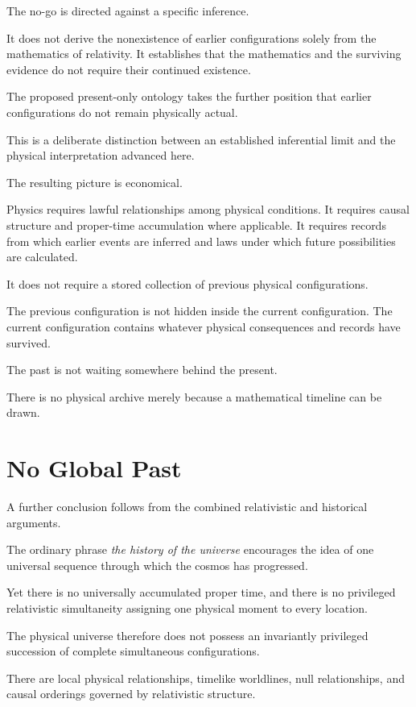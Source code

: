 \documentclass[12pt,onecolumn]{article}
\begin{document}
The no-go is directed against a specific inference.

It does not derive the nonexistence of earlier configurations solely from the mathematics of relativity. It establishes that the mathematics and the surviving evidence do not require their continued existence.

The proposed present-only ontology takes the further position that earlier configurations do not remain physically actual.

This is a deliberate distinction between an established inferential limit and the physical interpretation advanced here.

The resulting picture is economical.

Physics requires lawful relationships among physical conditions. It requires causal structure and proper-time accumulation where applicable. It requires records from which earlier events are inferred and laws under which future possibilities are calculated.

It does not require a stored collection of previous physical configurations.

The previous configuration is not hidden inside the current configuration. The current configuration contains whatever physical consequences and records have survived.

The past is not waiting somewhere behind the present.

There is no physical archive merely because a mathematical timeline can be drawn.

\section{No Global Past}

A further conclusion follows from the combined relativistic and historical arguments.

The ordinary phrase \emph{the history of the universe} encourages the idea of one universal sequence through which the cosmos has progressed.

Yet there is no universally accumulated proper time, and there is no privileged relativistic simultaneity assigning one physical moment to every location.

The physical universe therefore does not possess an invariantly privileged succession of complete simultaneous configurations.

There are local physical relationships, timelike worldlines, null relationships, and causal orderings governed by relativistic structure.
\end{document}
